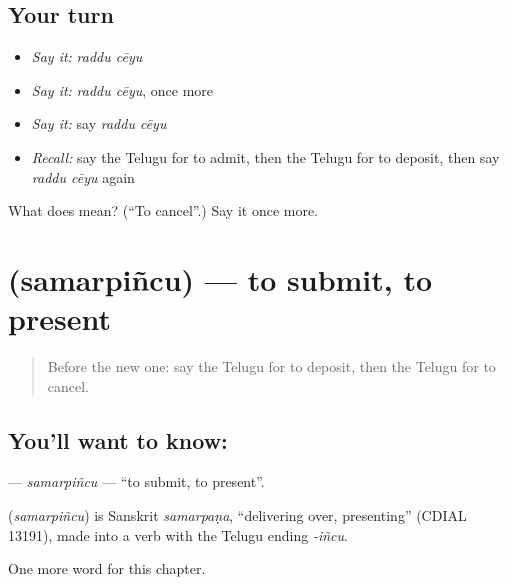 \subsection*{Your turn}
\begin{itemize}
\raggedright
  \item \emph{Say it:} \emph{raddu cēyu}
  \item \emph{Say it:} \emph{raddu cēyu}, once more
  \item \emph{Say it:} say \emph{raddu cēyu}
  \item \emph{Recall:} say the Telugu for to admit, then the Telugu for to deposit, then say \emph{raddu cēyu} again
\end{itemize}

\begin{tcolorbox}[breakable,colback=teal!4,colframe=teal!35!black,title={Before you move on}]
What does   mean? (\textquotedblleft{}To cancel\textquotedblright{}.) Say it once more.
\end{tcolorbox}
\section[\texorpdfstring{\te{సమర్పించు} (samarpiñcu)}{సమర్పించు (samarpiñcu)}]{ (samarpiñcu) — to submit, to present}

\label{lesson:TE-C281-samarpincu}



\begin{quote}
Before the new one: say the Telugu for to deposit, then the Telugu for to cancel.
\end{quote}

\subsection*{You'll want to know: }
\textbf{} — \emph{samarpiñcu} — \textquotedblleft{}to submit, to present\textquotedblright{}.

\begin{cousinweb}
\textbf{} (\emph{samarpiñcu}) is Sanskrit \emph{samarpaṇa}, \textquotedblleft{}delivering over, presenting\textquotedblright{} (CDIAL 13191), made into a verb with the Telugu ending \emph{-iñcu}.
\end{cousinweb}

\begin{grammarlens}[title={What you've built}]
One more word for this chapter.
\end{grammarlens}

